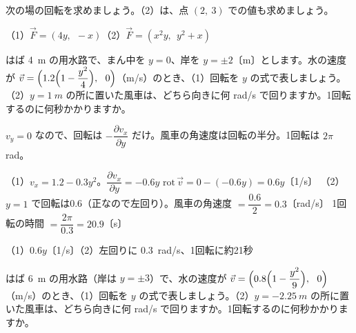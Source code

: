 \begin{jibun}
次の場の回転を求めましょう。（2）は、点 $(2,\ 3)$ での値も求めましょう。\par
（1）\nobreak $\vec F=(4y,\ \ -x)$\qquad（2）\nobreak $\vec F=(x^2y,\ \ y^2+x)$
\end{jibun}

\begin{reidai}[用水路の風車]
はば \qty{4}{m} の用水路で、まん中を $y=0$、岸を $y=\pm2$〔m〕とします。水の速度が $\vec v=\Bigl(1.2\Bigl(1-\dfrac{y^2}{4}\Bigr),\ \ 0\Bigr)$（m/s）のとき、（1）回転を $y$ の式で表しましょう。（2）$y=\qty{1}{m}$ の所に置いた風車は、どちら向きに何 rad/s で回りますか。1回転するのに何秒かかりますか。\par
\kangaekata $v_y=0$ なので、回転は $-\dfrac{\partial v_x}{\partial y}$ だけ。風車の角速度は回転の半分。1回転は $2\pi$ rad。\par
\shiki（1）$v_x=1.2-0.3y^2$。$\dfrac{\partial v_x}{\partial y}=-0.6y$\kviiikq
$\mathrm{rot}\,\vec v=0-(-0.6y)=0.6y$〔1/s〕\kviiikq
（2）$y=1$ で回転は0.6（正なので左回り）。風車の角速度 $=\dfrac{0.6}{2}=0.3$〔rad/s〕\kviiikq
1回転の時間 $=\dfrac{2\pi}{0.3}=20.9$〔s〕\par
\kotae（1）\nobreak $0.6y$〔1/s〕\quad（2）\nobreak 左回りに \qty{0.3}{rad/s}、1回転に約21秒
\end{reidai}

\begin{jibun}
はば \qty{6}{m} の用水路（岸は $y=\pm3$）で、水の速度が $\vec v=\Bigl(0.8\Bigl(1-\dfrac{y^2}{9}\Bigr),\ \ 0\Bigr)$（m/s）のとき、（1）回転を $y$ の式で表しましょう。（2）$y=\qty{-2.25}{m}$ の所に置いた風車は、どちら向きに何 rad/s で回りますか。1回転するのに何秒かかりますか。
\end{jibun}

